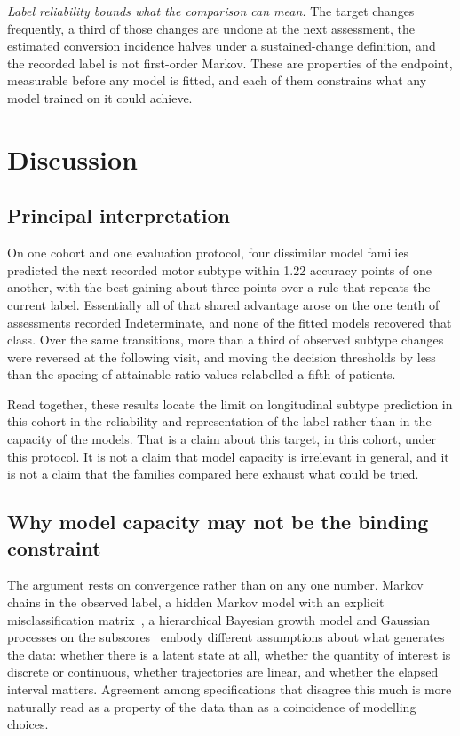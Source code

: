 \documentclass[11pt]{article}
\begin{document}
\emph{Label reliability bounds what the comparison can mean.} The target changes
frequently, a third of those changes are undone at the next assessment, the
estimated conversion incidence halves under a sustained-change definition, and
the recorded label is not first-order Markov. These are properties of the
endpoint, measurable before any model is fitted, and each of them constrains what
any model trained on it could achieve.

\section{Discussion}

\subsection{Principal interpretation}
On one cohort and one evaluation protocol, four dissimilar model families
predicted the next recorded motor subtype within 1.22 accuracy points of one
another, with the best gaining about three points over a rule that repeats the
current label. Essentially all of that shared advantage arose on the one tenth
of assessments recorded Indeterminate, and none of the fitted models recovered
that class. Over the same transitions, more than a third of observed subtype
changes were reversed at the following visit, and moving the decision thresholds
by less than the spacing of attainable ratio values relabelled a fifth of
patients.

Read together, these results locate the limit on longitudinal subtype prediction
in this cohort in the reliability and representation of the label rather than in
the capacity of the models. That is a claim about this target, in this cohort,
under this protocol. It is not a claim that model capacity is irrelevant in
general, and it is not a claim that the families compared here exhaust what
could be tried.

\subsection{Why model capacity may not be the binding constraint}
The argument rests on convergence rather than on any one number. Markov chains
in the observed label, a hidden Markov model with an explicit misclassification
matrix~\citep{jackson2011}, a hierarchical Bayesian growth model and Gaussian
processes on the subscores~\citep{rasmussen2006} embody different assumptions
about what generates the data: whether there is a latent state at all, whether
the quantity of interest is discrete or continuous, whether trajectories are
linear, and whether the elapsed interval matters. Agreement among specifications
that disagree this much is more naturally read as a property of the data than as
a coincidence of modelling choices.
\end{document}
